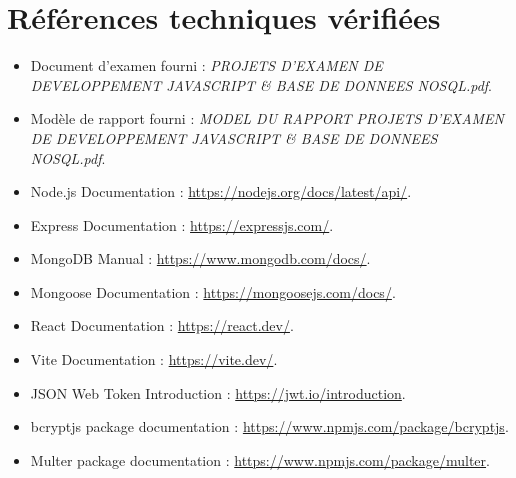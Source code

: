 \documentclass[12pt,a4paper]{article}
\begin{document}
\section*{Références techniques vérifiées}
\begin{itemize}
\item Document d'examen fourni : \textit{PROJETS D'EXAMEN DE DEVELOPPEMENT JAVASCRIPT \& BASE DE DONNEES NOSQL.pdf}.
\item Modèle de rapport fourni : \textit{MODEL DU RAPPORT PROJETS D'EXAMEN DE DEVELOPPEMENT JAVASCRIPT \& BASE DE DONNEES NOSQL.pdf}.
\item Node.js Documentation : \url{https://nodejs.org/docs/latest/api/}.
\item Express Documentation : \url{https://expressjs.com/}.
\item MongoDB Manual : \url{https://www.mongodb.com/docs/}.
\item Mongoose Documentation : \url{https://mongoosejs.com/docs/}.
\item React Documentation : \url{https://react.dev/}.
\item Vite Documentation : \url{https://vite.dev/}.
\item JSON Web Token Introduction : \url{https://jwt.io/introduction}.
\item bcryptjs package documentation : \url{https://www.npmjs.com/package/bcryptjs}.
\item Multer package documentation : \url{https://www.npmjs.com/package/multer}.
\end{itemize}
\end{document}
